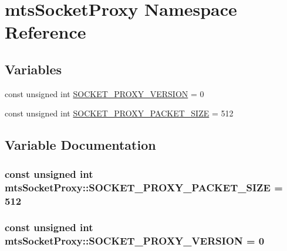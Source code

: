 \hypertarget{namespacemts_socket_proxy}{}\section{mts\+Socket\+Proxy Namespace Reference}
\label{namespacemts_socket_proxy}
\subsection*{Variables}
\begin{DoxyCompactItemize}
\item 
const unsigned int \hyperlink{namespacemts_socket_proxy_a53385561dff5ae4e824796d56edfbf8d}{S\+O\+C\+K\+E\+T\+\_\+\+P\+R\+O\+X\+Y\+\_\+\+V\+E\+R\+S\+I\+O\+N} = 0
\item 
const unsigned int \hyperlink{namespacemts_socket_proxy_a9817b972f85fbc28120e968dd7f50790}{S\+O\+C\+K\+E\+T\+\_\+\+P\+R\+O\+X\+Y\+\_\+\+P\+A\+C\+K\+E\+T\+\_\+\+S\+I\+Z\+E} = 512
\end{DoxyCompactItemize}


\subsection{Variable Documentation}
\hypertarget{namespacemts_socket_proxy_a9817b972f85fbc28120e968dd7f50790}{}
\subsubsection[{S\+O\+C\+K\+E\+T\+\_\+\+P\+R\+O\+X\+Y\+\_\+\+P\+A\+C\+K\+E\+T\+\_\+\+S\+I\+Z\+E}]{\setlength{\rightskip}{0pt plus 5cm}const unsigned int mts\+Socket\+Proxy\+::\+S\+O\+C\+K\+E\+T\+\_\+\+P\+R\+O\+X\+Y\+\_\+\+P\+A\+C\+K\+E\+T\+\_\+\+S\+I\+Z\+E = 512}\label{namespacemts_socket_proxy_a9817b972f85fbc28120e968dd7f50790}
\hypertarget{namespacemts_socket_proxy_a53385561dff5ae4e824796d56edfbf8d}{}
\subsubsection[{S\+O\+C\+K\+E\+T\+\_\+\+P\+R\+O\+X\+Y\+\_\+\+V\+E\+R\+S\+I\+O\+N}]{\setlength{\rightskip}{0pt plus 5cm}const unsigned int mts\+Socket\+Proxy\+::\+S\+O\+C\+K\+E\+T\+\_\+\+P\+R\+O\+X\+Y\+\_\+\+V\+E\+R\+S\+I\+O\+N = 0}\label{namespacemts_socket_proxy_a53385561dff5ae4e824796d56edfbf8d}
